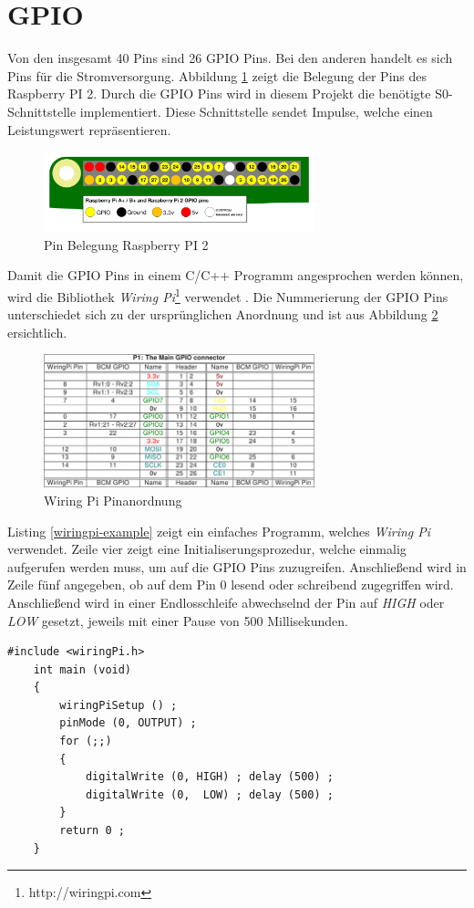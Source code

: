 \section{GPIO}\label{gpio}
Von den insgesamt 40 Pins sind 26 GPIO Pins. Bei den anderen handelt es sich Pins für die Stromversorgung. Abbildung \ref{gpio-pins} zeigt die Belegung der Pins des Raspberry PI 2. Durch die GPIO Pins wird in diesem Projekt die benötigte S0-Schnittstelle implementiert. Diese Schnittstelle sendet Impulse, welche einen Leistungswert repräsentieren.
\begin{figure}[H]
	\centering
	\includegraphics[width=0.7\textwidth]{bilder/gpio-pins.png}
	\caption{Pin Belegung Raspberry PI 2}
	\label{gpio-pins}
\end{figure}
\noindent
Damit die GPIO Pins in einem C/C++ Programm angesprochen werden können, wird die Bibliothek \textit{Wiring Pi}\footnote{http://wiringpi.com} verwendet \cite{wiringpi}.
Die Nummerierung der GPIO Pins unterschiedet sich zu der ursprünglichen Anordnung und ist aus Abbildung \ref{wiringpi} ersichtlich.
 \begin{figure}[H]
 	\centering
 	\includegraphics[width=0.7\textwidth]{bilder/wiringpi.png}
 	\caption{Wiring Pi Pinanordnung}
 	\label{wiringpi}
 \end{figure}
\noindent
Listing \ref{wiringpi-example} zeigt ein einfaches Programm, welches \textit{Wiring Pi} verwendet. Zeile vier zeigt eine Initialiserungsprozedur, welche einmalig aufgerufen werden muss, um auf die GPIO Pins zuzugreifen. Anschließend wird in Zeile fünf angegeben, ob auf dem Pin 0 lesend oder schreibend zugegriffen wird. Anschließend wird in einer Endlosschleife abwechselnd der Pin auf \textit{HIGH} oder \textit{LOW} gesetzt, jeweils mit einer Pause von 500 Millisekunden.
\pagebreak
\begin{lstlisting}[frame=single, caption=WiringPi Beispiel, label=wiringpi-example]
	#include <wiringPi.h>
	int main (void)
	{
		wiringPiSetup () ;
		pinMode (0, OUTPUT) ;
		for (;;)
		{
			digitalWrite (0, HIGH) ; delay (500) ;
			digitalWrite (0,  LOW) ; delay (500) ;
		}
		return 0 ;
	}
\end{lstlisting}

